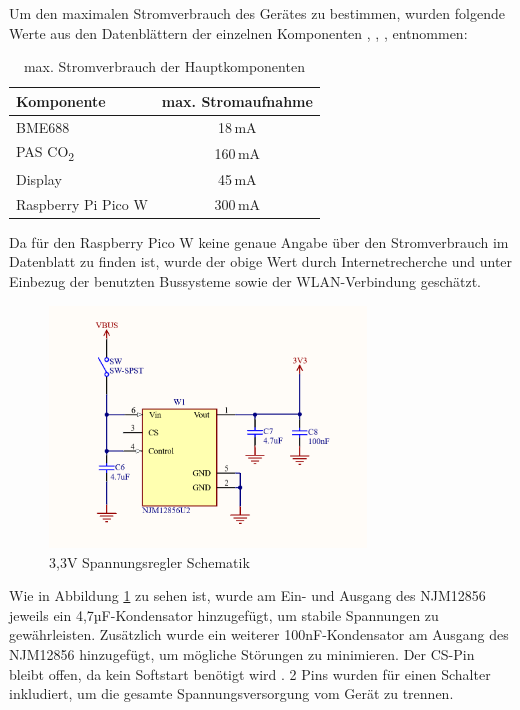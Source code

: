 \begin{inhalt}
Um den maximalen Stromverbrauch des Gerätes zu bestimmen, wurden folgende Werte aus den Datenblättern der einzelnen Komponenten \cite{Raspberry_Pi_Pico_W}, \cite{PASCO2V01}, \cite{BME688}, \cite{LCDDisplayDatasheet} entnommen: 


\renewcommand{\arraystretch}{1}

\begin{table}[H]
\centering
{}
\begin{tabular}{|l|c|}
\hline
\rowcolor{cyan!20}
\textbf{Komponente} & \textbf{max. Stromaufnahme} \\
\hline
BME688 & 18\,mA \\
\hline
PAS CO\textsubscript{2} & 160\,mA \\
\hline
Display & 45\,mA \\
\hline
Raspberry Pi Pico W & 300\,mA \\
\hline
\end{tabular}
\caption{max. Stromverbrauch der Hauptkomponenten}
\label{tab:Stromverbrauch}
\end{table}

Da für den Raspberry Pico W keine genaue Angabe über den Stromverbrauch im Datenblatt zu finden ist, wurde der obige Wert durch Internetrecherche \cite{PicoWCurrent} und unter Einbezug der benutzten Bussysteme sowie der WLAN-Verbindung geschätzt.

\begin{figure}[!htb]
\centering
\includegraphics[width=0.75\textwidth]{files/Tobias/pics/Schaltungen/Schematik/3V3_Converter_Schematik.PNG}
\caption[3,3V Spannungsregler Schematik]{3,3V Spannungsregler Schematik}
\label{fig:3,3V Spannungsregler Schematik}
\end{figure}

Wie in Abbildung \ref{fig:3,3V Spannungsregler Schematik} zu sehen ist, wurde am Ein- und Ausgang des NJM12856 jeweils ein 4,7µF-Kondensator hinzugefügt, um stabile Spannungen zu gewährleisten. Zusätzlich wurde ein weiterer 100nF-Kondensator am Ausgang des NJM12856 hinzugefügt, um mögliche Störungen zu minimieren. Der CS-Pin bleibt offen, da kein Softstart benötigt wird \cite{NJM12856}. 2 Pins wurden für einen Schalter inkludiert, um die gesamte Spannungsversorgung vom Gerät zu trennen. 



\end{inhalt}
